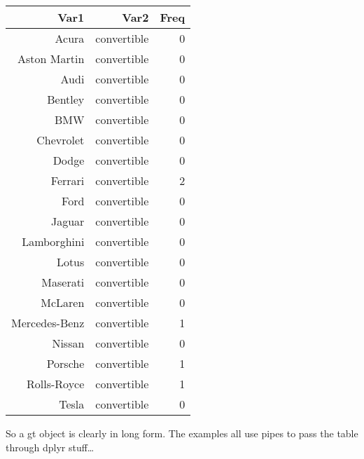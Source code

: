 \documentclass[]{article}
\begin{document}
\begin{longtable}{rrr}
\toprule
Var1 & Var2 & Freq \\ 
\midrule
Acura & convertible & 0 \\ 
Aston Martin & convertible & 0 \\ 
Audi & convertible & 0 \\ 
Bentley & convertible & 0 \\ 
BMW & convertible & 0 \\ 
Chevrolet & convertible & 0 \\ 
Dodge & convertible & 0 \\ 
Ferrari & convertible & 2 \\ 
Ford & convertible & 0 \\ 
Jaguar & convertible & 0 \\ 
Lamborghini & convertible & 0 \\ 
Lotus & convertible & 0 \\ 
Maserati & convertible & 0 \\ 
McLaren & convertible & 0 \\ 
Mercedes-Benz & convertible & 1 \\ 
Nissan & convertible & 0 \\ 
Porsche & convertible & 1 \\ 
Rolls-Royce & convertible & 1 \\ 
Tesla & convertible & 0 \\ 
\bottomrule
\end{longtable}

So a gt object is clearly in long form. The examples all use pipes to
pass the table through dplyr stuff\ldots{}
\end{document}
